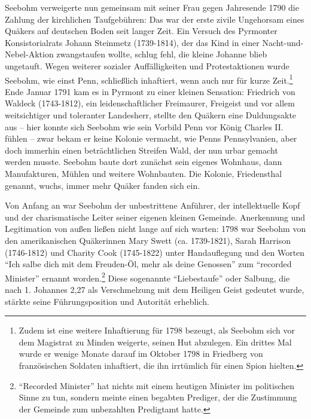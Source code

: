 Seebohm verweigerte nun gemeinsam mit seiner Frau gegen Jahresende 1790 die
Zahlung der kirchlichen Taufgebühren: Das war der erste zivile Ungehorsam eines
Quäkers auf deutschen Boden seit langer Zeit. Ein Versuch des Pyrmonter
Konsistorialrats Johann Steinmetz (1739-1814), der das Kind in einer
Nacht-und-Nebel-Aktion zwangstaufen wollte, schlug fehl, die kleine Johanne
blieb ungetauft. Wegen weiterer sozialer Auffälligkeiten und Protestaktionen
wurde Seebohm, wie einst Penn, schließlich inhaftiert, wenn auch nur für kurze
Zeit.\footnote{Zudem ist eine weitere Inhaftierung für 1798 bezeugt, als Seebohm
sich vor
dem Magistrat zu Minden weigerte, seinen Hut abzulegen. Ein drittes Mal wurde er
wenige Monate darauf im Oktober 1798 in Friedberg von französischen Soldaten
inhaftiert, die ihn irrtümlich für einen Spion hielten.} Ende Januar 1791 kam es
in Pyrmont zu einer kleinen Sensation: Friedrich von Waldeck (1743-1812), ein
leidenschaftlicher Freimaurer, Freigeist und vor allem weitsichtiger und
toleranter Landesherr, stellte den Quäkern eine Duldungsakte aus -- hier konnte
sich Seebohm wie sein Vorbild Penn vor König Charles II. fühlen -- zwar bekam er
keine Kolonie vermacht, wie Penns Pennsylvanien, aber doch immerhin einen
beträchtlichen Streifen Wald, der nun urbar gemacht werden musste. Seebohm baute
dort zunächst sein eigenes Wohnhaus, dann Manufakturen, Mühlen und weitere
Wohnbauten. Die Kolonie, Friedensthal genannt, wuchs, immer mehr Quäker fanden
sich ein.

\medskip

Von Anfang an war Seebohm der unbestrittene Anführer, der intellektuelle Kopf
und der charismatische Leiter seiner eigenen kleinen Gemeinde. Anerkennung und
Legitimation von außen ließen nicht lange auf sich warten: 1798 war Seebohm von
den amerikanischen Quäkerinnen Mary Swett (ca. 1739-1821), Sarah Harrison
(1746-1812) und Charity Cook (1745-1822) unter Handauflegung und den Worten
"`Ich salbe dich mit dem Freuden-Öl, mehr als deine Genossen"' zum "`recorded
Minister"' ernannt worden.\footnote{"`Recorded Minister"' hat nichts mit einem
heutigen Minister im politischen
Sinne zu tun, sondern meinte einen begabten Prediger, der die Zustimmung der
Gemeinde zum unbezahlten Predigtamt hatte.} Diese sogenannte "`Liebestaufe"'
oder Salbung, die nach 1. Johannes 2,27 als Verschmelzung mit dem Heiligen Geist
gedeutet wurde, stärkte seine Führungsposition und Autorität erheblich.

\medskip

